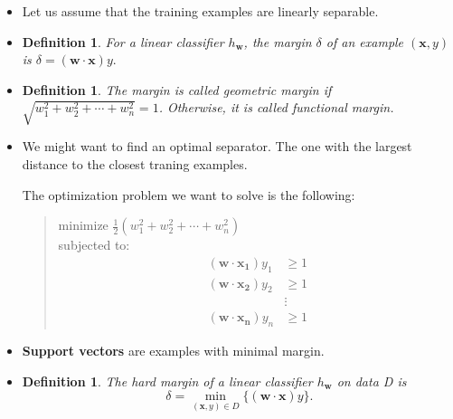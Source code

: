 \documentclass[10pt]{article}
\newtheorem{definition}[lemma]{Definition}
\begin{document}
\begin{itemize}
    \item Let us assume that the training examples are linearly
        separable.
    
    \item \begin{definition}
        For a linear classifier $h_\mathbf{w}$, the \emph{margin}
        $\delta$ of an example $(\mathbf{x},y)$
        is $\delta = (\mathbf{w}\cdot \mathbf{x})y.$
    \end{definition}
    
    \item \begin{definition}
        The margin is called \emph{geometric margin} if
        $\sqrt{w_1^2 + w_2^2 + \dotsb + w_n^2} = 1$. 
        Otherwise, it is called \emph{functional margin}.
    \end{definition}
    
    \item We might want to find an optimal separator. The one
        with the largest distance to the closest traning
        examples.
        
        The optimization problem we want to solve is
        the following:
        
        \begin{quote}
            minimize $\frac{1}{2} (w_1^2 + w_2^2 + \dotsb + w_n^2)$\\
            subjected to:
            \begin{align*}
                (\mathbf{w}\cdot\mathbf{x_1})y_1 &\geq 1\\
                (\mathbf{w}\cdot\mathbf{x_2})y_2 &\geq 1\\
                &\vdots\\
                (\mathbf{w}\cdot\mathbf{x_n})y_n &\geq 1
            \end{align*}
        \end{quote}
        
    \item {\bf Support vectors} are examples with minimal
        margin.
        
    \item \begin{definition}
        The \emph{hard margin} of a linear classifier $h_{\mathbf{w}}$ on data D is 
        $$\delta = \min_{(\mathbf{x},y)\in D} \{ (\mathbf{w} \cdot \mathbf{x} ) y\}.$$
    \end{definition}
    

\end{itemize}
\end{document}
